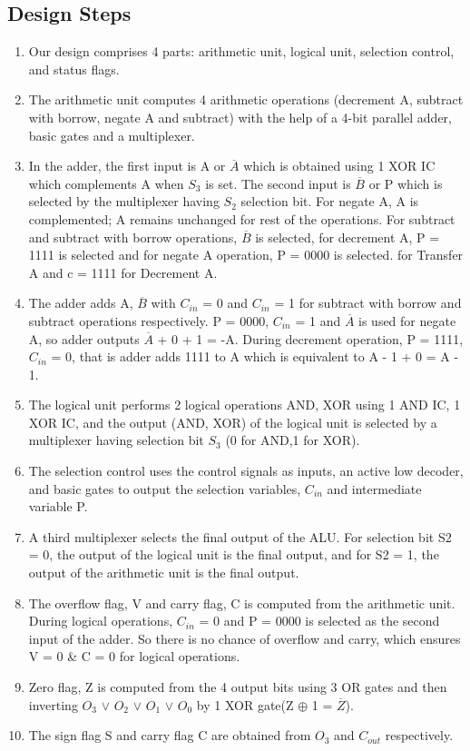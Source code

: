 \documentclass[18pt]{article}
\begin{document}
\subsection{Design Steps}
\begin{enumerate}[label=\roman*), before=\large]
\item Our design comprises 4 parts: arithmetic unit, logical unit,  selection control, and status flags.
    \item The arithmetic unit computes 4 arithmetic operations (decrement A, subtract with borrow, negate A
and subtract) with the help of a 4-bit parallel adder, basic gates and a multiplexer.
    \item In the adder, the first input is A or $\overline{A}$ which is obtained using 1 XOR IC which complements A when $S_{3}$ is set. The second input is $\overline{B}$ or P which is selected by the multiplexer having $S_{2}$ selection bit. For negate A, A is complemented; A remains unchanged for rest of the operations. For subtract and subtract with borrow operations, $\overline{B}$ is selected, for decrement A, P = 1111 is selected and for negate A operation, P = 0000 is selected.
for Transfer A and c = 1111 for Decrement A.
    \item The adder adds A, $\overline{B}$ with $C_{in}$ = 0 and $C_{in}$ = 1 for
    subtract with borrow and subtract operations respectively. P = 0000, $C_{in}$ = 1 and $\overline{A}$ 
     is used for negate A, so adder outputs $\overline{A}$ + 0 + 1 = -A. During decrement operation,
      P = 1111, $C_{in}$ = 0, that 
      is adder adds 1111 to A which is equivalent 
      to A - 1 + 0 = A - 1.
    \item The logical unit performs 2 logical operations AND, XOR using 1 AND IC, 1 XOR IC, and the output (AND, XOR) of the logical unit is selected by a multiplexer having
selection bit $S_{3}$ (0 for AND,1 for XOR).
    \item The selection control uses the control signals as inputs, an active low decoder, and basic 
gates to output the selection variables, $C_{in}$ and intermediate variable P.
    \item  A third multiplexer selects the final output of the ALU. For selection bit S2 = 0, the output of the logical unit is the final output, and for S2 = 1, the output of the
arithmetic unit is the final output.
    \item The overflow flag, V and carry flag, C is computed from the arithmetic unit. During logical operations, $C_{in}$ = 0 and P = 0000 is selected as the second input of the adder. So there is no chance of overflow and carry, which ensures V = 0 \& C = 0 for logical operations.
    \item Zero flag, Z is computed from the 4 output bits using 3 OR gates and then inverting \newline $O_{3}$ $\lor$ $O_{2}$ $\lor$ $O_{1}$ $\lor$ $O_{0}$ by 1 XOR gate(Z $\oplus$ 1 = $\overline{Z}$).
    \item The sign flag S and carry flag C are obtained from $O_{3}$ and $C_{out}$ respectively.
\end{enumerate}
\newpage
\normalsize
\end{document}
